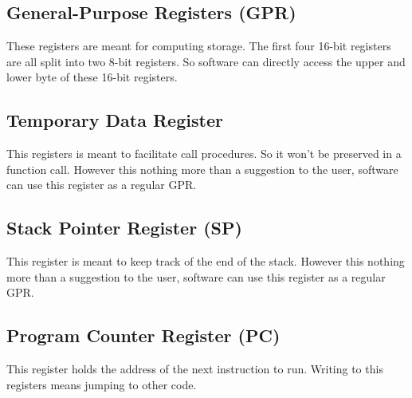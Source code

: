 \documentclass[oneside, a4paper]{memoir}
\begin{document}
\subsection{General-Purpose Registers (GPR)}
These registers are meant for computing storage. The first four 16-bit registers are all split into two 8-bit registers. So software can directly access the upper and lower byte of these 16-bit registers.
\subsection{Temporary Data Register}
This registers is meant to facilitate call procedures. So it won't be preserved in a function call. However this nothing more than a suggestion to the user, software can use this register as a regular GPR.
\subsection{Stack Pointer Register (SP)}
This register is meant to keep track of the end of the stack. However this nothing more than a suggestion to the user, software can use this register as a regular GPR.
\subsection{Program Counter Register (PC)}
This register holds the address of the next instruction to run. Writing to this registers means jumping to other code.
\end{document}
